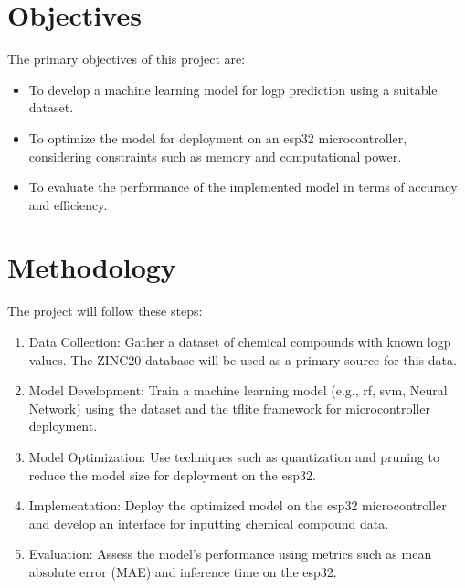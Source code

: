 \documentclass[12pt,a4paper,twoside,open=any]{scrreprt}
\begin{document}
\section*{Objectives}
The primary objectives of this project are:
\begin{itemize}
    \item To develop a machine learning model for \gls{logp} prediction using a suitable dataset.
    \item To optimize the model for deployment on an \gls{esp32} microcontroller, considering constraints such as memory and computational power.
    \item To evaluate the performance of the implemented model in terms of accuracy and efficiency.
\end{itemize}

\section*{Methodology}
The project will follow these steps:
\begin{enumerate}
    \item Data Collection: Gather a dataset of chemical compounds with known \gls{logp} values. The \gls{ZINC20} database will be used as a primary source for this data.
    \item Model Development: Train a machine learning model (e.g., \gls{rf}, \gls{svm}, Neural Network) using the dataset and the \gls{tflite} framework for microcontroller deployment.
    \item Model Optimization: Use techniques such as quantization and pruning to reduce the model size for deployment on the \gls{esp32}.
    \item Implementation: Deploy the optimized model on the \gls{esp32} microcontroller and develop an interface for inputting chemical compound data.
    \item Evaluation: Assess the model's performance using metrics such as mean absolute error (MAE) and inference time on the \gls{esp32}.
\end{enumerate}
\end{document}
